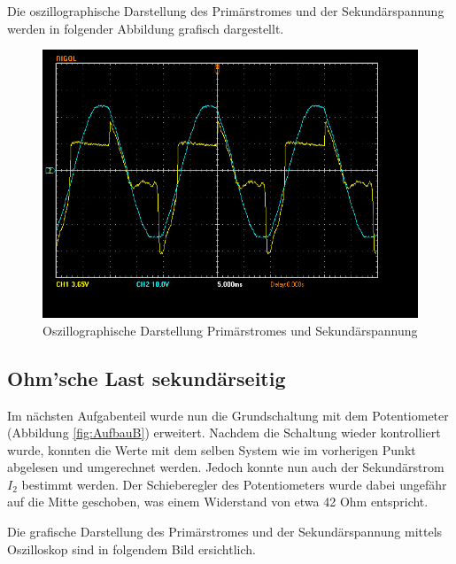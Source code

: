 \documentclass[12pt,a4paper,twoside]{article}
\begin{document}
\noindent
Die oszillographische Darstellung des Primärstromes und der Sekundärspannung werden in folgender Abbildung grafisch dargestellt.

\begin{figure}[H]
    \centering
    \includegraphics[width=0.6\linewidth, angle=0]{nudes/A1 Oszi.jpg}
    \caption{Oszillographische Darstellung Primärstromes und Sekundärspannung}
    \label{fig:OszilloskopA}
\end{figure}


\subsection{Ohm'sche Last sekundärseitig}

Im nächsten Aufgabenteil wurde nun die Grundschaltung mit dem Potentiometer (Abbildung \ref{fig:AufbauB}) erweitert. Nachdem die Schaltung wieder kontrolliert wurde, konnten die Werte mit dem selben System wie im vorherigen Punkt abgelesen und umgerechnet werden.
Jedoch konnte nun auch der Sekundärstrom $I_{2}$ bestimmt werden. Der Schieberegler des Potentiometers wurde dabei ungefähr auf die Mitte geschoben, was einem Widerstand von etwa 42 Ohm entspricht.

\begin{table}[H]
    \centering
    \caption{Messwerte Ohm'sche Last}
    \label{tab:messwerteOhm}
\end{table}

\noindent
Die grafische Darstellung des Primärstromes und der Sekundärspannung mittels Oszilloskop sind in folgendem Bild ersichtlich.
\end{document}
